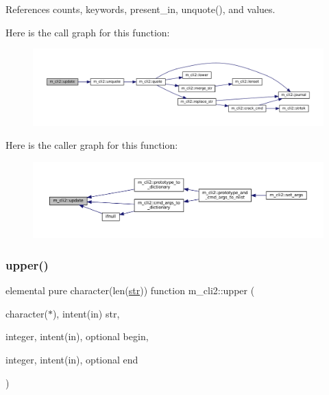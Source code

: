 References counts, keywords, present\+\_\+in, unquote(), and values.

Here is the call graph for this function\+:
\nopagebreak
\begin{figure}[H]
\begin{center}
\leavevmode
\includegraphics[width=350pt]{namespacem__cli2_a160d56bc4a10faef7e8a8a4f04f4dadb_cgraph}
\end{center}
\end{figure}
Here is the caller graph for this function\+:
\nopagebreak
\begin{figure}[H]
\begin{center}
\leavevmode
\includegraphics[width=350pt]{namespacem__cli2_a160d56bc4a10faef7e8a8a4f04f4dadb_icgraph}
\end{center}
\end{figure}
\mbox{\label{namespacem__cli2_afa7a2419002024ff6d950c5d905ddd7a}} 
\subsubsection{\texorpdfstring{upper()}{upper()}}
{\footnotesize\ttfamily elemental pure character(len(\mbox{\hyperlink{interfacem__cli2_1_1str}{str}})) function m\+\_\+cli2\+::upper (\begin{DoxyParamCaption}\item[{character($\ast$), intent(in)}]{str,  }\item[{integer, intent(in), optional}]{begin,  }\item[{integer, intent(in), optional}]{end }\end{DoxyParamCaption})\hspace{0.3cm}{\ttfamily [private]}}



